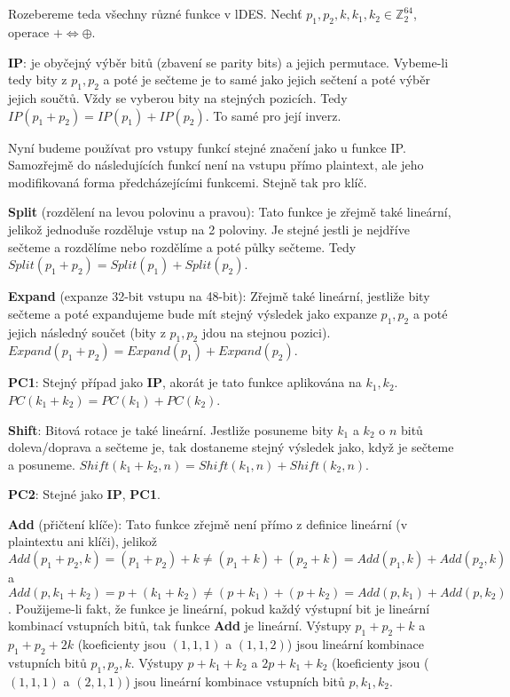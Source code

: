 \documentclass[12pt, a4paper]{article}
\begin{document}
\section{}
Rozebereme teda všechny různé funkce v lDES. Nechť $p_1,p_2,k,k_1,k_2 \in \mathbb{Z}_2^{64}$, operace $+ \iff \oplus$.

\textbf{IP}: je obyčejný výběr bitů (zbavení se parity bits) a jejich permutace. Vybeme-li tedy bity z $p_1, p_2$ a poté je sečteme je to samé jako jejich sečtení a poté výběr jejich součtů. Vždy se vyberou bity na stejných pozicích. Tedy $IP(p_1 + p_2)=IP(p_1)+IP(p_2)$. To samé pro její inverz.

Nyní budeme používat pro vstupy funkcí stejné značení jako u funkce IP. Samozřejmě do následujících funkcí není na vstupu přímo plaintext, ale jeho modifikovaná forma předcházejícími funkcemi. Stejně tak pro klíč.

\textbf{Split} (rozdělení na levou polovinu a pravou): Tato funkce je zřejmě také lineární, jelikož jednoduše rozděluje vstup na 2 poloviny. Je stejné jestli je nejdříve sečteme a rozdělíme nebo rozdělíme a poté půlky sečteme. Tedy $Split(p_1 + p_2) = Split(p_1)+Split(p_2)$.

\textbf{Expand} (expanze 32-bit vstupu na 48-bit): Zřejmě také lineární, jestliže bity sečteme a poté expandujeme bude mít stejný výsledek jako expanze $p_1, p_2$ a poté jejich následný součet (bity z $p_1, p_2$ jdou na stejnou pozici). $Expand(p_1+p_2)=Expand(p_1)+Expand(p_2)$.

\textbf{PC1}: Stejný případ jako \textbf{IP}, akorát je tato funkce aplikována na $k_1, k_2$. $PC(k_1+k_2)=PC(k_1)+PC(k_2)$.

\textbf{Shift}: Bitová rotace je také lineární. Jestliže posuneme bity $k_1$ a $k_2$ o $n$ bitů doleva/doprava a sečteme je, tak dostaneme stejný výsledek jako, když je sečteme a posuneme. $Shift(k_1+k_2,n) = Shift(k_1,n)+Shift(k_2,n)$.

\textbf{PC2}: Stejné jako \textbf{IP}, \textbf{PC1}.

\textbf{Add} (přičtení klíče): Tato funkce zřejmě není přímo z definice lineární (v plaintextu ani klíči), jelikož $Add(p_1+p_2,k)=(p_1+p_2)+k \neq (p_1+k)+(p_2+k) = Add(p_1,k)+Add(p_2,k)$ a $Add(p,k_1+k_2)=p+(k_1+k_2) \neq (p+k_1)+(p+k_2) = Add(p,k_1)+Add(p,k_2)$. Použijeme-li fakt, že funkce je lineární, pokud každý výstupní bit je lineární kombinací vstupních bitů, tak funkce \textbf{Add} je lineární. Výstupy $p_1+p_2+k $ a $p_1+p_2+2k$ (koeficienty jsou $(1,1,1)$ a $(1,1,2)$) jsou lineární kombinace vstupních bitů $p_1,p_2,k$. Výstupy $p+k_1+k_2$ a $2p+k_1+k_2$ (koeficienty jsou ($(1,1,1)$ a $(2,1,1)$) jsou lineární kombinace vstupních bitů $p,k_1,k_2$.
\end{document}
